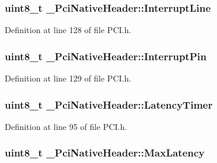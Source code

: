 \subsubsection[{\texorpdfstring{Interrupt\+Line}{InterruptLine}}]{\setlength{\rightskip}{0pt plus 5cm}uint8\+\_\+t \+\_\+\+Pci\+Native\+Header\+::\+Interrupt\+Line}\hypertarget{struct__PciNativeHeader_a5d3013816300453589fefcd1ed9c5cee}{}\label{struct__PciNativeHeader_a5d3013816300453589fefcd1ed9c5cee}


Definition at line 128 of file P\+C\+I.\+h.

\subsubsection[{\texorpdfstring{Interrupt\+Pin}{InterruptPin}}]{\setlength{\rightskip}{0pt plus 5cm}uint8\+\_\+t \+\_\+\+Pci\+Native\+Header\+::\+Interrupt\+Pin}\hypertarget{struct__PciNativeHeader_aa1d37e93fd702731475ccc0775b048d8}{}\label{struct__PciNativeHeader_aa1d37e93fd702731475ccc0775b048d8}


Definition at line 129 of file P\+C\+I.\+h.

\subsubsection[{\texorpdfstring{Latency\+Timer}{LatencyTimer}}]{\setlength{\rightskip}{0pt plus 5cm}uint8\+\_\+t \+\_\+\+Pci\+Native\+Header\+::\+Latency\+Timer}\hypertarget{struct__PciNativeHeader_a730fa76240530058c4833de2b1fd6925}{}\label{struct__PciNativeHeader_a730fa76240530058c4833de2b1fd6925}


Definition at line 95 of file P\+C\+I.\+h.

\subsubsection[{\texorpdfstring{Max\+Latency}{MaxLatency}}]{\setlength{\rightskip}{0pt plus 5cm}uint8\+\_\+t \+\_\+\+Pci\+Native\+Header\+::\+Max\+Latency}\hypertarget{struct__PciNativeHeader_af9a63a39fe2cd333b78e77b0c8a9652e}{}\label{struct__PciNativeHeader_af9a63a39fe2cd333b78e77b0c8a9652e}


